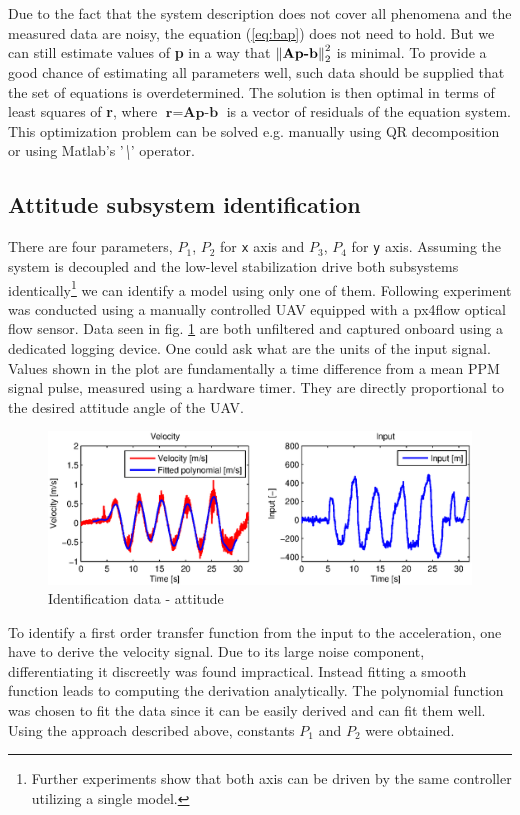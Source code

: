 Due to the fact that the system description does not cover all phenomena and the measured data are noisy, the equation (\ref{eq:bap}) does not need to hold. But we can still estimate values of \textbf{p} in a way that $\left\lVert\textbf{Ap-b}\right\rVert_2^2$ is minimal. To provide a good chance of estimating all parameters well, such data should be supplied that the set of equations is overdetermined. The solution is then optimal in terms of least squares of \textbf{r}, where $\textbf{r} = \textbf{Ap-b}$ is a vector of residuals of the equation system. This optimization problem can be solved e.g. manually using QR decomposition or using Matlab's '\textit{\textbackslash}' operator.

\subsection{Attitude subsystem identification}

There are four parameters, $P_1$, $P_2$ for \texttt{x} axis and $P_3$, $P_4$ for \texttt{y} axis. Assuming the system is decoupled and the low-level stabilization drive both subsystems identically\footnote{Further experiments show that both axis can be driven by the same controller utilizing a single model.} we can identify a model using only one of them. Following experiment was conducted using a manually controlled UAV equipped with a px4flow optical flow sensor. Data seen in fig. \ref{fig:iden1} are both unfiltered and captured onboard using a dedicated logging device. One could ask what are the units of the input signal. Values shown in the plot are fundamentally a time difference from a mean PPM signal pulse, measured using a hardware timer. They are directly proportional to the desired attitude angle of the UAV.

\begin{figure}[h]
\includegraphics[width=1\textwidth]{fig/iden1.eps} 
\caption{Identification data - attitude}
\label{fig:iden1}
\end{figure}

To identify a first order transfer function from the input to the acceleration, one have to derive the velocity signal. Due to its large noise component, differentiating it discreetly was found impractical. Instead fitting a smooth function leads to computing the derivation analytically. The polynomial function was chosen to fit the data since it can be easily derived and can fit them well. Using the approach described above, constants $P_1$ and $P_2$ were obtained.

